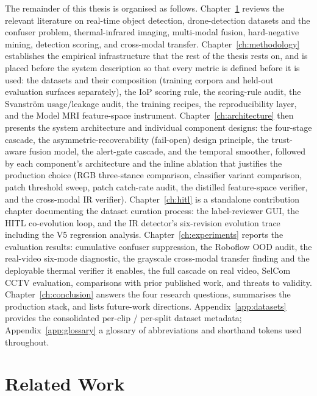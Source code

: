 \documentclass[12pt,a4paper,oneside,openright]{book}
\begin{document}
The remainder of this thesis is organised as follows. Chapter~\ref{ch:literature} reviews the relevant literature on real-time object detection, drone-detection datasets and the confuser problem, thermal-infrared imaging, multi-modal fusion, hard-negative mining, detection scoring, and cross-modal transfer. Chapter~\ref{ch:methodology} establishes the empirical infrastructure that the rest of the thesis rests on, and is placed before the system description so that every metric is defined before it is used: the datasets and their composition (training corpora and held-out evaluation surfaces separately), the IoP scoring rule, the scoring-rule audit, the Svanstr\"om usage/leakage audit, the training recipes, the reproducibility layer, and the Model MRI feature-space instrument. Chapter~\ref{ch:architecture} then presents the system architecture and individual component designs: the four-stage cascade, the asymmetric-recoverability (fail-open) design principle, the trust-aware fusion model, the alert-gate cascade, and the temporal smoother, followed by each component's architecture and the inline ablation that justifies the production choice (RGB three-stance comparison, classifier variant comparison, patch threshold sweep, patch catch-rate audit, the distilled feature-space verifier, and the cross-modal IR verifier). Chapter~\ref{ch:hitl} is a standalone contribution chapter documenting the dataset curation process: the label-reviewer GUI, the HITL co-evolution loop, and the IR detector's six-revision evolution trace including the V5 regression analysis. Chapter~\ref{ch:experiments} reports the evaluation results: cumulative confuser suppression, the Roboflow OOD audit, the real-video six-mode diagnostic, the grayscale cross-modal transfer finding and the deployable thermal verifier it enables, the full cascade on real video, SelCom CCTV evaluation, comparisons with prior published work, and threats to validity. Chapter~\ref{ch:conclusion} answers the four research questions, summarises the production stack, and lists future-work directions. Appendix~\ref{app:datasets} provides the consolidated per-clip / per-split dataset metadata; Appendix~\ref{app:glossary} a glossary of abbreviations and shorthand tokens used throughout.

\chapter{Related Work}
\label{ch:literature}
\end{document}
